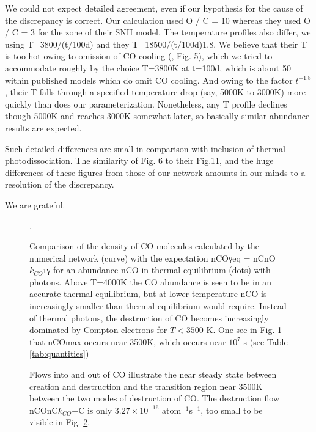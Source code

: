 \documentclass[manuscript]{aastex}
\begin{document}
We could not expect detailed agreement, even if our hypothesis for the
cause of the discrepancy is correct. Our calculation used
O / C = 10 whereas they used O / C = 3 for the zone of their SNII model.
The temperature profiles also differ, we using T=3800/(t/100d) and they
T=18500/(t/100d)1.8.
We believe that their T is too hot owing to omission of CO cooling
(\citealp{1996ApJ...471..480L}, Fig. 5),
which we tried to accommodate roughly by
the choice T=3800K at t=100d, which is about 50%
within published models which do omit CO cooling. And owing to the
factor $t^{-1.8}$, their T falls through a specified temperature drop
(say, 5000K to 3000K) more quickly than does our parameterization.
Nonetheless, any T profile declines though 5000K and reaches 3000K
somewhat later, so basically similar abundance results are expected. 

Such detailed differences are small in comparison with inclusion of
thermal photodissociation. The similarity of Fig. 6 to their Fig.11,
and the huge differences of these figures from those of our network
amounts in our minds to a resolution of the discrepancy. 

\acknowledgments

We are grateful.

\clearpage

\begin{figure}
\caption{
Comparison of the density of CO molecules calculated by the numerical
network (curve) with the expectation nCOγeq = nCnO$k_{CO}$τγ for an abundance
nCO in thermal equilibrium (dots) with photons.
Above T=4000K the CO abundance is seen to be in an accurate thermal
equilibrium, but at lower temperature nCO is increasingly smaller than
thermal equilibrium would require. Instead of thermal photons,
the destruction of CO becomes increasingly dominated by
Compton electrons for $T < 3500$ K.
One see in Fig. \ref{fig:nco} that nCOmax occurs near 3500K,
which occurs near $10^7$ s (see Table \ref{tab:quantities})}. 
\label{fig:nco}
\end{figure}

\clearpage

\begin{figure}
\caption{
Flows into and out of CO illustrate the near steady state between creation
and destruction and the transition region near 3500K between the two modes
of destruction of CO. The destruction flow nCOnC$k_{CO}$+C is only $3.27 \times
10^{-16}$ atom$^{-1}$s$^{-1}$, too small to be visible in Fig. \ref{fig:flows}. 
} \label{fig:flows}
\end{figure}
\end{document}
